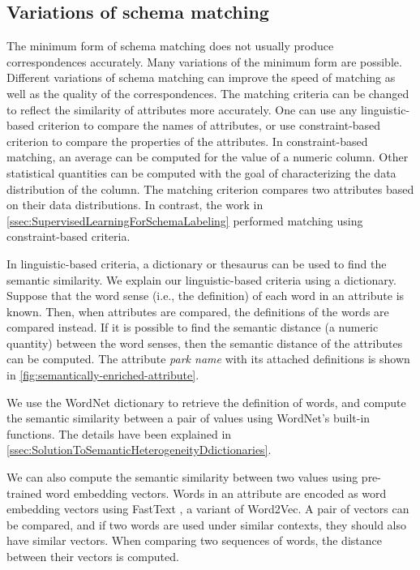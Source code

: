 \subsection{Variations of schema matching}
\label{ssec:VariationsOfSchemaMatching}

The minimum form of schema matching does not usually produce correspondences accurately. Many variations of the minimum form are possible. Different variations of schema matching can improve the speed of matching as well as the quality of the correspondences. The matching criteria can be changed to reflect the similarity of attributes more accurately. One can use any linguistic-based criterion to compare the names of attributes, or use constraint-based criterion to compare the properties of the attributes. In constraint-based matching, an average can be computed for the value of a numeric column. Other statistical quantities can be computed with the goal of characterizing the data distribution of the column. The matching criterion compares two attributes based on their data distributions. In contrast, the work in \autoref{ssec:SupervisedLearningForSchemaLabeling} performed matching using constraint-based criteria.

In linguistic-based criteria, a dictionary or thesaurus can be used to find the semantic similarity. We explain our linguistic-based criteria using a dictionary. Suppose that the word sense (i.e., the definition) of each word in an attribute is known. Then, when attributes are compared, the definitions of the words are compared instead. If it is possible to find the semantic distance (a numeric quantity) between the word senses, then the semantic distance of the attributes can be computed. The attribute \textit{park name} with its attached definitions is shown in \autoref{fig:semantically-enriched-attribute}.

We use the WordNet dictionary to retrieve the definition of words, and compute the semantic similarity between a pair of values using WordNet's built-in functions. The details have been explained in \autoref{ssec:SolutionToSemanticHeterogeneityDdictionaries}.

We can also compute the semantic similarity between two values using pre-trained word embedding vectors. Words in an attribute are encoded as word embedding vectors using FastText \cite{Mudgal2018Deep,Nargesian2018Table}, a variant of Word2Vec. A pair of vectors can be compared, and if two words are used under similar contexts, they should also have similar vectors. When comparing two sequences of words, the distance between their vectors is computed.

